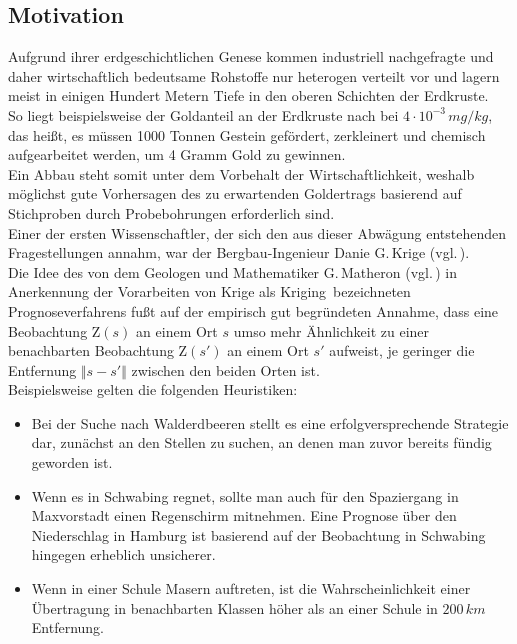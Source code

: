 \subsection{Motivation}
Aufgrund ihrer erdgeschichtlichen Genese kommen industriell nachgefragte
und daher wirtschaftlich bedeutsame Rohstoffe nur heterogen verteilt vor 
und lagern meist in einigen Hundert Metern Tiefe in den oberen Schichten
der Erdkruste.\\
So liegt beispielsweise der Goldanteil an der Erdkruste nach \cite{Haynes2017}
bei $4\cdot 10^{-3}\,mg/kg$, das heißt, es müssen 1000 Tonnen Gestein 
gefördert, zerkleinert und chemisch aufgearbeitet werden,  um 4 Gramm 
Gold zu gewinnen.\\ 
Ein Abbau steht somit unter dem Vorbehalt der Wirtschaftlichkeit, weshalb 
möglichst gute Vorhersagen des zu erwartenden Goldertrags basierend auf
Stichproben durch Probebohrungen erforderlich sind.\\ 
Einer der ersten Wissenschaftler, der sich den aus dieser Abwägung 
entstehenden Fragestellungen annahm, war der Bergbau-Ingenieur 
Danie G.\,Krige (vgl.\,\cite{Krige1951}).\\
Die Idee des von dem Geologen und Mathematiker G.\,Matheron 
(vgl.\,\cite{Matheron1963}) 
in Anerkennung der Vorarbeiten von Krige als 
\glqq Kriging\grqq\ bezeichneten Prognoseverfahrens fußt auf der empirisch gut begründeten Annahme, dass eine 
Beobachtung $\mathrm{Z}(s)$ 
an einem Ort $s$ umso mehr Ähnlichkeit zu einer benachbarten 
Beobachtung $\mathrm{Z}(s')$ an einem Ort $s'$ aufweist, je geringer die 
Entfernung $\Vert s-s'\Vert$ zwischen den beiden Orten ist.\\

Beispielsweise gelten die folgenden Heuristiken:
\begin{itemize}[topsep=2pt,parsep=1pt,itemsep=0.5pt]
\item[$\circ$ ]
Bei der Suche nach Walderdbeeren stellt es eine erfolgversprechende
Strategie dar, zunächst an den Stellen zu suchen, an denen man zuvor bereits 
fündig geworden ist.
\item[$\circ$ ] Wenn es in Schwabing regnet, sollte man auch für 
den Spaziergang in Maxvorstadt einen Regenschirm
mitnehmen. Eine Prognose über den Niederschlag in Hamburg
ist basierend auf der Beobachtung in Schwabing hingegen erheblich unsicherer.
\item[$\circ$ ] Wenn in einer Schule Masern auftreten, ist die
Wahrscheinlichkeit einer Übertragung in benachbarten Klassen höher 
als an einer Schule in $200\,km$ Entfernung.
\end{itemize}

